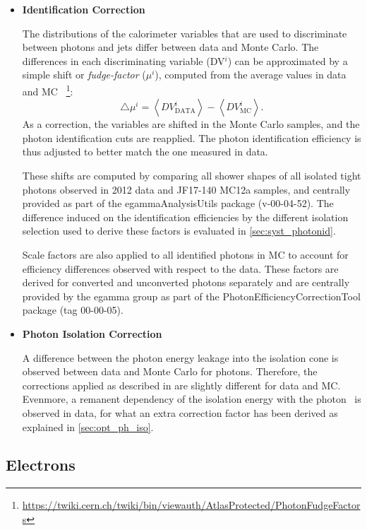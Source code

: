 \begin{itemize}
\item[]{\bf Identification Correction}

The distributions of the calorimeter variables that are used to
discriminate between photons and jets differ between data and Monte
Carlo. The differences in each discriminating variable (DV$^i$) can be approximated by a simple shift or {\it fudge-factor} ($\mu^i$), computed from the average values in data and MC~\cite{ATLAS-CONF-2012-123}
\footnote{\url{https://twiki.cern.ch/twiki/bin/viewauth/AtlasProtected/PhotonFudgeFactors}}:
\begin{equation}
  \bigtriangleup \mu^i =
\left< DV^i_\mathrm{DATA}\right> - \left<DV^i_\mathrm{MC}\right>.
\end{equation}
As a correction, the variables are shifted in the Monte Carlo samples,
and the photon identification cuts are reapplied. The photon
identification efficiency is thus adjusted to better match the
one measured in data.

These shifts are computed by comparing all shower shapes of all isolated tight
photons observed in 2012 data and JF17-140 MC12a samples, and centrally provided
as part of the egammaAnalysisUtils package (v-00-04-52).
The difference induced on the identification efficiencies by the different isolation
selection used to derive these factors is evaluated in \Sec \ref{sec:syst_photonid}.

Scale factors are also applied to all identified photons in MC to account for efficiency differences
observed with respect to the data. These factors are derived for converted and unconverted photons
separately and are centrally provided by the egamma group as part of the PhotonEfficiencyCorrectionTool package (tag 00-00-05).

\item[]{\bf Photon Isolation Correction}

A difference between the photon energy leakage into the isolation cone is
observed between data and Monte Carlo for photons. Therefore, the
corrections applied as described in \Ref \cite{Hance:1379530} are slightly
different for data and MC. Evenmore, a remanent dependency of the isolation
energy with the photon \pt\ is observed in data, for what an extra correction factor
has been derived as explained in \Sec \ref{sec:opt_ph_iso}.

\end{itemize}

\subsection{Electrons}
\label{sec:elec_obj}

